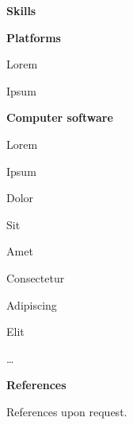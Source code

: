 \documentclass[a4paper,12pt,final]{memoir}
\newcommand{\Sep}{\vspace{1.5em}}
\newcommand{\SmallSep}{\vspace{0.5em}}
\newcommand{\CVSection}[1]
	{\Large\textbf{#1}\par
	\SmallSep\normalsize\normalfont}
\newcommand{\CVItem}[1]
	{\textbf{\color{RoyalBlue} #1}}
\begin{document}
\CVSection{Skills}
\CVItem{Platforms}
\begin{multicols}{3}
\begin{compactitem}[\color{RoyalBlue}$\circ$]
\item Lorem
\item Ipsum
\end{compactitem}
\end{multicols}
\SmallSep

\CVItem{Computer software}
\begin{multicols}{3}
\begin{compactitem}[\color{RoyalBlue}$\circ$]
\item Lorem
\item Ipsum
\item Dolor
\item Sit
\item Amet
\item Consectetur
\item Adipiscing
\item Elit
\item \ldots
\end{compactitem}
\end{multicols}
\Sep

\CVSection{References}
References upon request.

\end{document}
